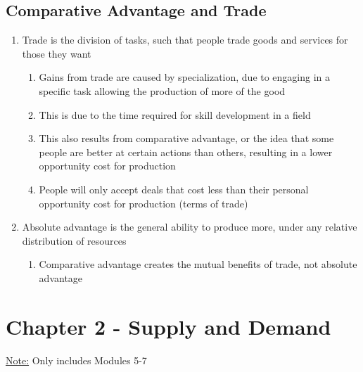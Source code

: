 \documentclass[11 pt, twoside]{article}
\begin{document}
\subsection{Comparative Advantage and Trade}
\begin{enumerate}
\item Trade is the division of tasks, such that people trade goods and services for those they want
\begin{enumerate}
\item Gains from trade are caused by specialization, due to engaging in a specific task allowing the production of more of the good
\item This is due to the time required for skill development in a field
\item This also results from comparative advantage, or the idea that some people are better at certain actions than others, resulting in a lower opportunity cost for production
\item People will only accept deals that cost less than their personal opportunity cost for production (terms of trade)
\end{enumerate}
\item Absolute advantage is the general ability to produce more, under any relative distribution of resources
\begin{enumerate}
\item Comparative advantage creates the mutual benefits of trade, not absolute advantage
\end{enumerate}
\end{enumerate}

\section{Chapter 2 - Supply and Demand}
\underline{Note:} Only includes Modules 5-7
\end{document}
